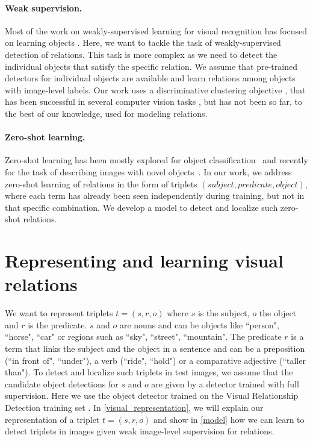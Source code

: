 \documentclass[10pt,twocolumn,letterpaper]{article}
\newif\ifkeepComments
\newcommand{\JP}[1]{\ifkeepComments\textcolor{red}{{\bf JP:} #1}\fi}
\newcommand{\spaceparagraph}{\vspace{-.35cm}}
\begin{document}
\spaceparagraph
\paragraph{Weak supervision.} Most of the work on weakly-supervised learning for visual recognition has focused on learning objects \cite{ Bilen16,fangCVPR15,Oquab15}. Here, we want to tackle the task of weakly-supervised detection of relations. This task is more complex as we need to detect the individual objects that satisfy the specific relation. We assume that pre-trained detectors for individual objects are available and learn relations among objects with image-level labels. Our work uses a discriminative clustering objective \cite{bach2008diffrac}, that has been successful in several computer vision tasks \cite{Bojanowski2014,joulin2014}, but has not been so far, to the best of our knowledge, used for modeling relations.


\spaceparagraph
\paragraph{Zero-shot learning.} Zero-shot learning has been mostly explored for object classification~\cite{Frome2013,Lazaridou2014a,Socher2013a,Xian16} and recently for the task of describing images with novel objects~\cite{Hendricks2015,Venugopalan2016}. In our work, we address zero-shot learning of relations in the form of triplets $(subject,predicate,object)$, where each term has already been seen independently during training, but not in that specific combination. We develop a model to detect and localize such zero-shot relations. 


\section{Representing and learning visual relations}

We want to represent triplets $t = (s, r, o)$ where $s$ is the
subject, $o$ the object and $r$ is the predicate. $s$ and $o$ are
nouns and can be objects like ``person", ``horse", ``car" or regions such as  ``sky",
``street", ``mountain". The predicate $r$ is a term that links the subject and the object in a sentence and can be a preposition (``in front of", ``under"), a verb (``ride", ``hold") or a comparative adjective (``taller than"). To detect and localize such triplets in test images, we assume that the candidate object detections for $s$ and $o$ are given by a detector trained with full supervision. Here we use the object detector \cite{girshick15fastrcnn} trained on the Visual Relationship Detection training set \cite{Lu16}. In \ref{visual_representation}, we will explain our representation of a triplet $t = (s, r, o)$  and show in \ref{model} how we can learn to detect triplets in images given weak image-level supervision for relations. 
\end{document}
